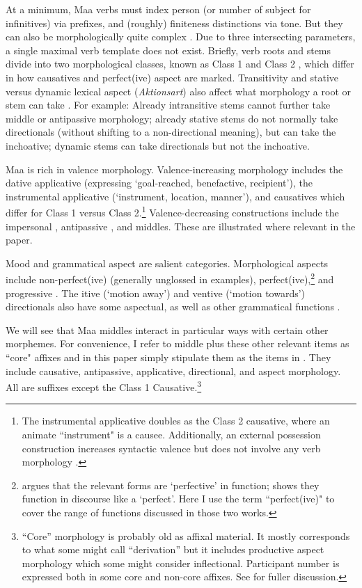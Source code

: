 \documentclass[output=paper,colorlinks,citecolor=brown
]{langscibook}
\begin{document}
At a minimum, Maa verbs must index person (or number of subject for infinitives) via prefixes, and (roughly) finiteness distinctions via tone. But they can also be morphologically quite complex \citep[51-95]{TuckerMpaayei1955}. Due to three intersecting parameters, a single maximal verb template does not exist. Briefly, verb roots and stems divide into two morphological classes, known as Class 1 and Class 2 \citep[52]{TuckerMpaayei1955}, which differ in how causatives and perfect(ive) aspect are marked. Transitivity and stative versus dynamic lexical aspect (\textit{Aktionsart}) also affect what morphology a root or stem can take \citep{Payne2015b}.  For example: Already intransitive stems cannot further take middle or antipassive morphology; already stative stems do not normally take directionals (without shifting to a non-directional meaning), but can take the inchoative; dynamic stems can take directionals but not the inchoative.

Maa is rich in valence morphology. Valence-increasing morphology includes the dative applicative (expressing ‘goal-reached, benefactive, recipient’), the instrumental applicative (‘instrument, location, manner'), and causatives which differ for Class 1 versus Class 2.\footnote{The instrumental applicative doubles as the Class 2 causative, where an animate ``instrument" is a causee. Additionally, an external possession construction increases syntactic valence but does not involve any verb morphology \citep{Payne1997-extposs}.} Valence-decreasing constructions include the impersonal \citep{Greenberg1959, Payne2011}, antipassive \citep{Payne2021-apas}, and middles. These are illustrated where relevant in the paper.

Mood and grammatical aspect are salient categories. Morphological aspects include non-perfect(ive) (generally unglossed in examples), perfect(ive),\footnote{\citet{Konig1993} argues that the relevant forms are `perfective' in function; \citet{Payne2015a} shows they function in discourse like a `perfect'. Here I use the term ``perfect(ive)" to cover the range of functions discussed in those two works.} and progressive \citep{Konig1993, Payne2015a}.  The itive (`motion away') and ventive (`motion towards') directionals also have some aspectual, as well as other grammatical functions \citep{Payne2021-am}.

We will see that Maa middles interact in particular ways with certain other morphemes. For convenience, I refer to middle plus these other relevant items as ``core" affixes and in this paper simply stipulate them as the items in . They include causative, antipassive, applicative, directional, and aspect morphology. All are suffixes except the Class 1 Causative.\footnote{“Core” morphology is probably old as affixal material. It mostly corresponds to what some might call “derivation” but it includes productive aspect morphology which some might consider inflectional. Participant number is expressed both in some core and non-core affixes. See \citet{Payne2015b} for fuller discussion.}
\end{document}

